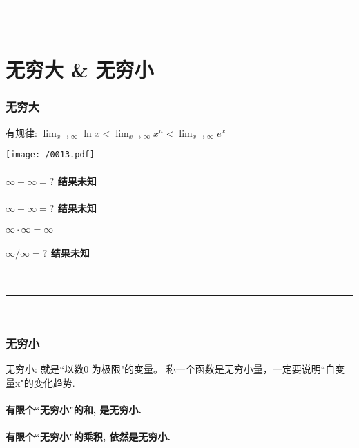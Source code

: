 \documentclass[UTF8]{ctexart}
\begin{document}
~\\
\hrule
~\\

\part{无穷大 \& 无穷小}

\section{无穷大}


有规律: $ \lim_{x \to \infty} \ln x < \lim_{x \to \infty}  x^n < \lim_{x \to \infty} e^x $

\texttt{[image: /0013.pdf]}


\subsection{$ \infty + \infty = ? $ 结果未知 } 

\subsection{$ \infty - \infty = ? $ 结果未知 } 

\subsection{$ \infty \cdot \infty = \infty $  } 

\subsection{$ \infty / \infty = ? $ 结果未知 } 



~\\
\hrule
~\\

\section{无穷小}

无穷小: 就是``以数0 为极限"的变量。 称一个函数是无穷小量，一定要说明``自变量x"的变化趋势.

\subsection{有限个``无穷小"的和, 是无穷小. } 

\subsection{有限个``无穷小"的乘积, 依然是无穷小. } 
\end{document}
